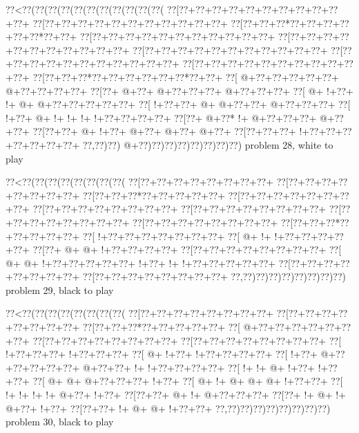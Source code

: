 \vbox{\vbox{\goo
\0??<\0??(\0??(\0??(\0??(\0??(\0??(\0??(\0??(\0??(\0??(\0??(
\0??[\0??+\0??+\0??+\0??+\0??+\0??+\0??+\0??+\0??+\0??+\0??+
\0??[\0??+\0??+\0??+\0??+\0??+\0??+\0??+\0??+\0??+\0??+\0??+
\0??[\0??+\0??+\0??*\0??+\0??+\0??+\0??+\0??+\0??*\0??+\0??+
\0??[\0??+\0??+\0??+\0??+\0??+\0??+\0??+\0??+\0??+\0??+\0??+
\0??[\0??+\0??+\0??+\0??+\0??+\0??+\0??+\0??+\0??+\0??+\0??+
\0??[\0??+\0??+\0??+\0??+\0??+\0??+\0??+\0??+\0??+\0??+\0??+
\0??[\0??+\0??+\0??+\0??+\0??+\0??+\0??+\0??+\0??+\0??+\0??+
\0??[\0??+\0??+\0??+\0??+\0??+\0??+\0??+\0??+\0??+\0??+\0??+
\0??[\0??+\0??+\0??*\0??+\0??+\0??+\0??+\0??+\0??*\0??+\0??+
\0??[\- @+\0??+\0??+\0??+\0??+\0??+\- @+\0??+\0??+\0??+\0??+
\0??[\0??+\- @+\0??+\- @+\0??+\0??+\0??+\- @+\0??+\0??+\0??+
\0??[\- @+\- !+\0??+\- !+\- @+\- @+\0??+\0??+\0??+\0??+\0??+
\0??[\- !+\0??+\0??+\- @+\- @+\0??+\0??+\- @+\0??+\0??+\0??+
\0??[\- !+\0??+\- @+\- !+\- !+\- !+\- !+\0??+\0??+\0??+\0??+
\0??[\0??+\- @+\0??*\- !+\- @+\0??+\0??+\0??+\- @+\0??+\0??+
\0??[\0??+\0??+\- @+\- !+\0??+\- @+\0??+\- @+\0??+\- @+\0??+
\0??[\0??+\0??+\0??+\- !+\0??+\0??+\0??+\0??+\0??+\0??+\0??+
\0??,\0??)\0??)\- @+\0??)\0??)\0??)\0??)\0??)\0??)\0??)\0??)
}
\hfil problem 28, white to play\hfil\break
}

\vbox{\vbox{\goo
\0??<\0??(\0??(\0??(\0??(\0??(\0??(\0??(\0??(
\0??[\0??+\0??+\0??+\0??+\0??+\0??+\0??+\0??+
\0??[\0??+\0??+\0??+\0??+\0??+\0??+\0??+\0??+
\0??[\0??+\0??+\0??*\0??+\0??+\0??+\0??+\0??+
\0??[\0??+\0??+\0??+\0??+\0??+\0??+\0??+\0??+
\0??[\0??+\0??+\0??+\0??+\0??+\0??+\0??+\0??+
\0??[\0??+\0??+\0??+\0??+\0??+\0??+\0??+\0??+
\0??[\0??+\0??+\0??+\0??+\0??+\0??+\0??+\0??+
\0??[\0??+\0??+\0??+\0??+\0??+\0??+\0??+\0??+
\0??[\0??+\0??+\0??*\0??+\0??+\0??+\0??+\0??+
\0??[\- !+\0??+\0??+\0??+\0??+\0??+\0??+\0??+
\0??[\- @+\- !+\- !+\0??+\0??+\0??+\0??+\0??+
\0??[\0??+\- @+\- @+\- !+\0??+\0??+\0??+\0??+
\0??[\0??+\0??+\0??+\0??+\0??+\0??+\0??+\0??+
\0??[\- @+\- @+\- !+\0??+\0??+\0??+\0??+\0??+
\- !+\0??+\- !+\- !+\0??+\0??+\0??+\0??+\0??+
\0??[\0??+\0??+\0??+\0??+\0??+\0??+\0??+\0??+
\0??[\0??+\0??+\0??+\0??+\0??+\0??+\0??+\0??+
\0??,\0??)\0??)\0??)\0??)\0??)\0??)\0??)\0??)
}
\hfil problem 29, black to play\hfil\break
}

\vbox{\vbox{\goo
\0??<\0??(\0??(\0??(\0??(\0??(\0??(\0??(\0??(
\0??[\0??+\0??+\0??+\0??+\0??+\0??+\0??+\0??+
\0??[\0??+\0??+\0??+\0??+\0??+\0??+\0??+\0??+
\0??[\0??+\0??+\0??*\0??+\0??+\0??+\0??+\0??+
\0??[\- @+\0??+\0??+\0??+\0??+\0??+\0??+\0??+
\0??[\0??+\0??+\0??+\0??+\0??+\0??+\0??+\0??+
\0??[\0??+\0??+\0??+\0??+\0??+\0??+\0??+\0??+
\0??[\- !+\0??+\0??+\0??+\- !+\0??+\0??+\0??+
\0??[\- @+\- !+\0??+\- !+\0??+\0??+\0??+\0??+
\0??[\- !+\0??+\- @+\0??+\0??+\0??+\0??+\0??+
\- @+\0??+\0??+\- !+\- !+\0??+\0??+\0??+\0??+
\0??[\- !+\- !+\- @+\- !+\0??+\- !+\0??+\0??+
\0??[\- @+\- @+\- @+\0??+\0??+\0??+\- !+\0??+
\0??[\- @+\- !+\- @+\- @+\- @+\- !+\0??+\0??+
\0??[\- !+\- !+\- !+\- !+\- @+\0??+\- !+\0??+
\0??[\0??+\0??+\- @+\- !+\- @+\0??+\0??+\0??+
\0??[\0??+\- !+\- @+\- !+\- @+\0??+\- !+\0??+
\0??[\0??+\0??+\- !+\- @+\- @+\- !+\0??+\0??+
\0??,\0??)\0??)\0??)\0??)\0??)\0??)\0??)\0??)
}
\hfil problem 30, black to play\hfil\break
}

